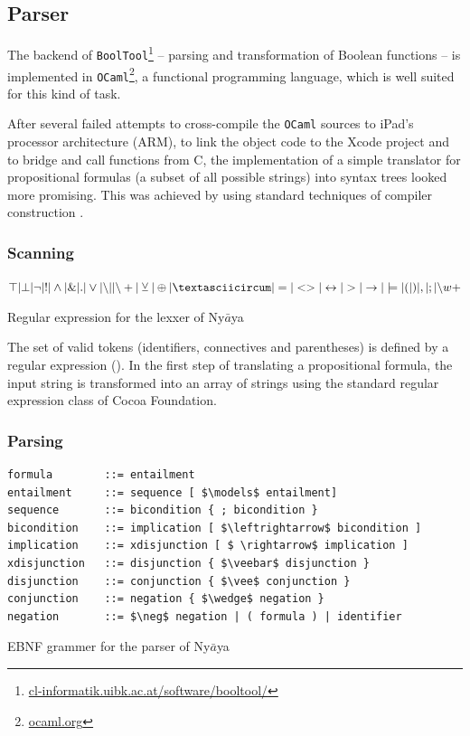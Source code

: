 \subsection{Parser}

The backend of \verb+BoolTool+\footnote{
\href{http://cl-informatik.uibk.ac.at/software/booltool/}{cl-informatik.uibk.ac.at/software/booltool/}} 
– parsing and transformation of Boolean functions – 
is implemented in \verb+OCaml+\footnote{
\href{http://ocaml.org}{ocaml.org}}, 
a functional programming language, which is well suited for this kind of task.

After several failed attempts to cross-compile the \verb+OCaml+ sources to iPad's processor architecture (ARM),
to link the object code to the Xcode project and to bridge and call functions from C, 
the implementation of a simple translator 
for propositional formulas (a subset of all possible strings)
into syntax trees looked more promising. 
This was achieved by using standard techniques of compiler construction \cite{Louden:1997:CCP:523017}. 

\subsubsection{Scanning}

\begin{table}[htdp]
\begin{center}
$\top | \bot 
| \neg | !
| \wedge | \& | .
| \vee | {\setminus}| | {\setminus}+ 
| \veebar | \oplus | \textasciicircum
| = | <> | \leftrightarrow 
| > | \rightarrow | \models
| ( | ) | , | ; 
| {\setminus}w+$ 
\caption{Regular expression for the lexxer of Ny$\bar{a}$ya}
\label{tab:REGEX}
\end{center}
\end{table}
The set of valid tokens (identifiers, connectives and parentheses) 
is defined by a regular expression (). 
In the first step of translating a propositional formula,
the input string is transformed into an array of strings 
using the standard regular expression class of Cocoa Foundation.

\subsubsection{Parsing}
\begin{table}[htdp]
\begin{center}
\begin{lstlisting}[mathescape]
formula        ::= entailment
entailment     ::= sequence [ $\models$ entailment]
sequence       ::= bicondition { ; bicondition } 
bicondition    ::= implication [ $\leftrightarrow$ bicondition ]
implication    ::= xdisjunction [ $ \rightarrow$ implication ]
xdisjunction   ::= disjunction { $\veebar$ disjunction }
disjunction    ::= conjunction { $\vee$ conjunction }
conjunction    ::= negation { $\wedge$ negation }
negation       ::= $\neg$ negation | ( formula ) | identifier
\end{lstlisting}
\caption{EBNF grammer for the parser of Ny$\bar{a}$ya}
\label{tab:EBNF}
\end{center}
\end{table}


